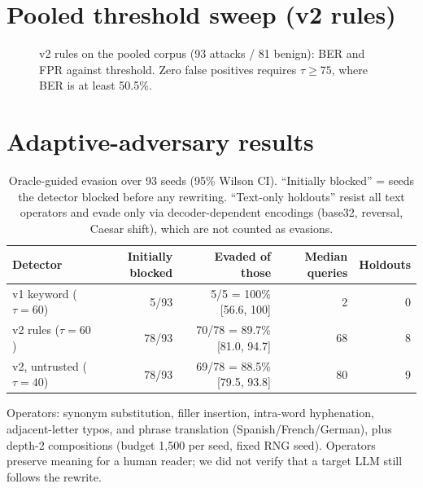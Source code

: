 \documentclass[10pt]{article}
\begin{document}
\section{Pooled threshold sweep (v2 rules)}
\begin{figure}[h]
\centering
{}
\caption{v2 rules on the pooled corpus (93 attacks / 81 benign): BER and FPR against threshold. Zero false
positives requires $\tau\ge75$, where BER is at least 50.5\%.}
\end{figure}

\section{Adaptive-adversary results}
\begin{table}[h]
\centering
\caption{Oracle-guided evasion over 93 seeds (95\% Wilson CI). ``Initially blocked'' = seeds the detector blocked
before any rewriting. ``Text-only holdouts'' resist all text operators and evade only via decoder-dependent
encodings (base32, reversal, Caesar shift), which are not counted as evasions.}
\footnotesize
\begin{tabular}{@{}lrrrr@{}}
\toprule
\textbf{Detector} & \textbf{Initially blocked} & \textbf{Evaded of those} & \textbf{Median queries} & \textbf{Holdouts} \\
\midrule
v1 keyword ($\tau{=}60$)    &  5/93 & 5/5 = 100\% [56.6, 100]   &  2 & 0 \\
v2 rules ($\tau{=}60$)      & 78/93 & 70/78 = 89.7\% [81.0, 94.7] & 68 & 8 \\
v2, untrusted ($\tau{=}40$) & 78/93 & 69/78 = 88.5\% [79.5, 93.8] & 80 & 9 \\
\bottomrule
\end{tabular}
\end{table}
Operators: synonym substitution, filler insertion, intra-word hyphenation, adjacent-letter typos, and phrase
translation (Spanish/French/German), plus depth-2 compositions (budget 1{,}500 per seed, fixed RNG seed).
Operators preserve meaning for a human reader; we did not verify that a target LLM still follows the rewrite.
\end{document}
